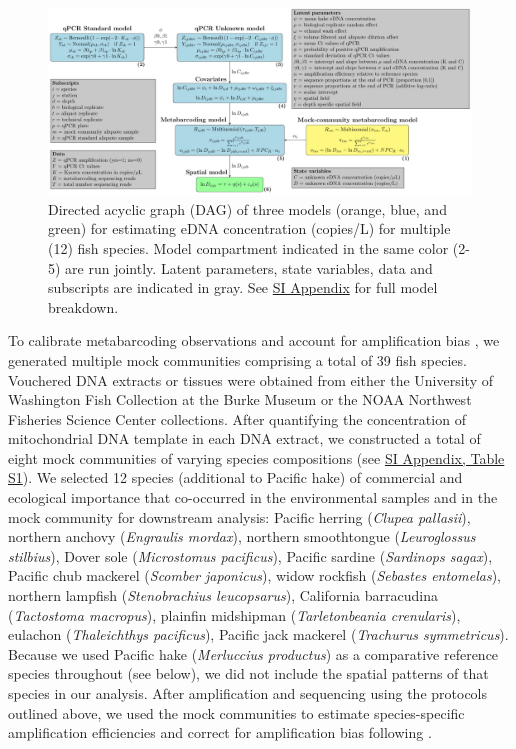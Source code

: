 \documentclass[9pt,twocolumn,twoside]{pnas-new}
\begin{document}
{\begin{figure}[tbhp]  %
\centering
\includegraphics[width=18cm]{plots/ppt_figures/DAG.pdf}  %
\caption{Directed acyclic graph (DAG) of three models (orange, blue, and green) for estimating eDNA concentration (copies/L) for multiple (12) fish species. Model compartment indicated in the same color (2-5) are run jointly. Latent parameters, state variables, data and subscripts are indicated in gray. See \href{SI_Appendix.pdf}{SI Appendix} for full model breakdown.}
\label{fig:DAG}
\end{figure}

To calibrate metabarcoding observations and account for amplification bias \cite{shelton2023,gold2023}, we generated multiple mock communities comprising a total of 39 fish species. Vouchered DNA extracts or tissues were obtained from either the University of Washington Fish Collection at the Burke Museum or the NOAA Northwest Fisheries Science Center collections. After quantifying the concentration of mitochondrial DNA template in each DNA extract, we constructed a total of eight mock communities of varying species compositions (see \href{SI_Appendix.pdf}{SI Appendix, Table S1}). We selected 12 species (additional to Pacific hake) of commercial and ecological importance that co-occurred in the environmental samples and in the mock community for downstream analysis: Pacific herring (\textit{Clupea pallasii}), northern anchovy (\textit{Engraulis mordax}), northern smoothtongue (\textit{Leuroglossus stilbius}), Dover sole (\textit{Microstomus pacificus}), Pacific sardine (\textit{Sardinops sagax}), Pacific chub mackerel (\textit{Scomber japonicus}), widow rockfish (\textit{Sebastes entomelas}), northern lampfish (\textit{Stenobrachius leucopsarus}), California barracudina (\textit{Tactostoma macropus}), plainfin midshipman (\textit{Tarletonbeania crenularis}), eulachon (\textit{Thaleichthys pacificus}), Pacific jack mackerel (\textit{Trachurus symmetricus}). Because we used Pacific hake (\textit{Merluccius productus}) as a comparative reference species throughout (see below), we did not include the spatial patterns of that species in our analysis. After amplification and sequencing using the protocols outlined above, we used the mock communities to estimate species-specific amplification efficiencies and correct for amplification bias following \cite{shelton2022}.

}
\end{document}
